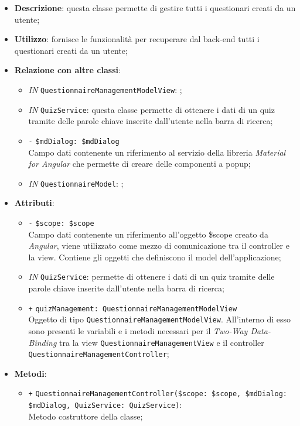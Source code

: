 \begin{itemize}
	\item \textbf{Descrizione}: questa classe permette di gestire tutti i questionari creati da un utente; 
	\item \textbf{Utilizzo}: fornisce le funzionalità per recuperare dal back-end tutti i questionari creati da un utente;
	\item \textbf{Relazione con altre classi}:
	\begin{itemize}
		\item \textit{IN} \texttt{QuestionnaireManagementModelView}: ;
		\item \textit{IN} \texttt{QuizService}: questa classe permette di ottenere i dati di un quiz tramite delle parole chiave inserite dall'utente nella barra di ricerca;
		\item \texttt{-} \texttt{\$mdDialog: \$mdDialog} \\
		Campo dati contenente un riferimento al servizio della libreria \textit{Material for Angular} che permette di creare delle componenti a popup;
		\item \textit{IN} \texttt{QuestionnaireModel}: ;
	\end{itemize}
	\item \textbf{Attributi}:
	\begin{itemize}
		\item \texttt{-} \texttt{\$scope: \$scope} \\
		Campo dati contenente un riferimento all’oggetto \$scope creato da \textit{Angular}, viene utilizzato come mezzo di comunicazione tra il controller e la view. Contiene gli oggetti che definiscono il model dell’applicazione;
		\item \textit{IN} \texttt{QuizService}: permette di ottenere i dati di un quiz tramite delle parole chiave inserite dall'utente nella barra di ricerca;
		\item \texttt{+} \texttt{quizManagement: QuestionnaireManagementModelView} \\
		Oggetto di tipo \texttt{QuestionnaireManagementModelView}. All'interno di esso sono presenti le variabili e i metodi necessari per il \textit{Two-Way Data-Binding} tra la view \texttt{QuestionnaireManagementView} e il controller \texttt{QuestionnaireManagementController};
	\end{itemize}
	\item \textbf{Metodi}:
	\begin{itemize}
		\item \texttt{+} \texttt{QuestionnaireManagementController(\$scope: \$scope, \$mdDialog: \$mdDialog, QuizService: QuizService)}: \\Metodo costruttore della classe;\\

\end{itemize}
\end{itemize}
